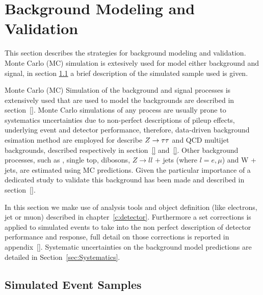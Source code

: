 \section{Background Modeling and Validation}
\label{sec:BackgroundEstimation}

This section describes the strategies for background modeling and validation.
Monte Carlo (MC) simulation is extesively used for model either background and signal, 
in section \ref{sec:SimSamples} a brief description of the simulated sample used is given.

Monte Carlo (MC) Simulation of the background and signal processes is extensively
used that are used to model the backgrounds are described in section~\ref{}.
Monte Carlo simulations of any process are usually prone to systematics
uncertainties due to non-perfect descriptions of pileup effects,
underlying event and detector performance, therefore,
data-driven background esimation method are employed for describe $Z\rightarrow \tau\tau$ and QCD multijet backgrounds,
described respectively in section~\ref{} and~\ref{}.
Other background processes, such as \ttbar, single top, dibosons, $Z
\rightarrow ll$ + jets (where $l = e,\mu$) and W + jets, are estimated
using MC predictions. Given the particular importance of \ttbar a dedicated study to validate
this background has been made and described in section~\ref{}.

In this section we make use of analysis tools and object definition
(like electrons, jet or muon) described in chapter~\ref{c:detector}. Furthermore
a set corrections is applied to simulated events to take into the non perfect 
description of detector performance and response, full detail on those corrections
is reported in appendix~\ref{}.
Systematic uncertainties on the background model predictions 
are detailed in Section~\ref{sec:Systematics}.

\subsection{Simulated Event Samples}
\label{sec:SimSamples}


